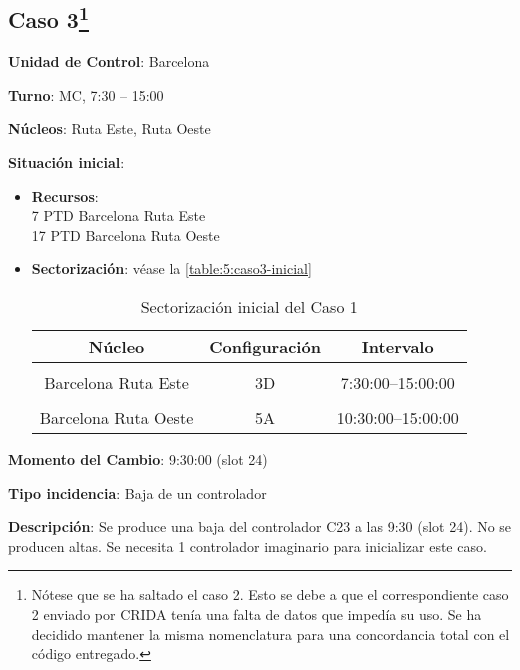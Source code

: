 \subsection[Caso 3]{Caso 3\footnote{Nótese que se ha saltado el caso 2. Esto se debe a que el correspondiente caso 2 enviado por \gls{CRIDA} tenía una falta de datos que impedía su uso. Se ha decidido mantener la misma nomenclatura para una concordancia total con el código entregado.}}

\textbf{Unidad de Control}: Barcelona

\textbf{Turno}: MC, 7:30 -- 15:00

\textbf{Núcleos}: Ruta Este, Ruta Oeste

\textbf{Situación inicial}:
\begin{itemize}[label={}]
	
	\item \textbf{Recursos}: \\
	7 PTD Barcelona Ruta Este \\
	17 PTD Barcelona Ruta Oeste
	
	
	\item \textbf{Sectorización}: véase la \autoref{table:5:caso3-inicial}
	\begin{table}[h]
		\centering
		\caption{Sectorización inicial del Caso 1}
		\begin{tabular}{ccc}
			\hline
			\textbf{Núcleo}      & \textbf{Configuración} & \textbf{Intervalo}   \\ \hline
			\multicolumn{1}{l}{} & \multicolumn{1}{l}{}   & \multicolumn{1}{l}{} \\
			Barcelona Ruta Este  & 3D                     & 7:30:00--15:00:00    \\
			\multicolumn{1}{l}{} & \multicolumn{1}{l}{}   & \multicolumn{1}{l}{} \\
			Barcelona Ruta Oeste & 5A                     & 10:30:00--15:00:00   \\ \hline
		\end{tabular}
		\label{table:5:caso3-inicial}
	\end{table}
	
\end{itemize}

\textbf{Momento del Cambio}: 9:30:00 (slot 24) %

\textbf{Tipo incidencia}: Baja de un controlador

\textbf{Descripción}: Se produce una baja del controlador C23 a las 9:30 (slot 24). No se producen altas. Se necesita 1 controlador imaginario para inicializar este caso.


